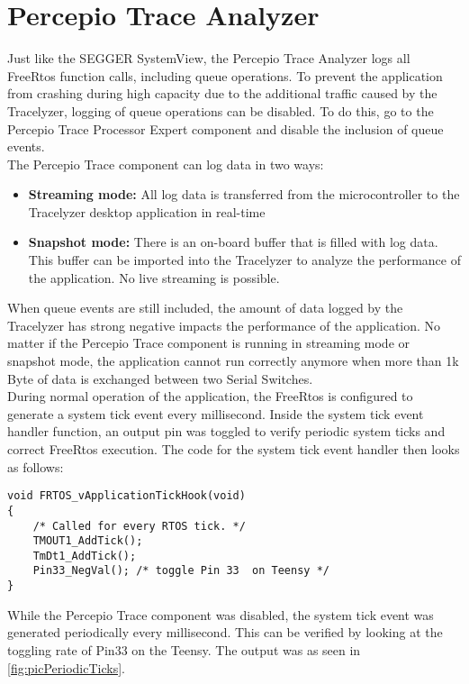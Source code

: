 \section{Percepio Trace Analyzer}
%
%
Just like the SEGGER SystemView, the Percepio Trace Analyzer logs all FreeRtos function calls, including queue operations. To prevent the application from crashing during high capacity due to the additional traffic caused by the Tracelyzer, logging of queue operations can be disabled. To do this, go to the Percepio Trace Processor Expert component and disable the inclusion of queue events.\\
The Percepio Trace component can log data in two ways:
\begin{itemize}
    \item \textbf{Streaming mode:} All log data is transferred from the microcontroller to the Tracelyzer desktop application in real-time
    \item \textbf{Snapshot mode:} There is an on-board buffer that is filled with log data. This buffer can be imported into the Tracelyzer to analyze the performance of the application. No live streaming is possible.
\end{itemize}
When queue events are still included, the amount of data logged by the Tracelyzer has strong negative impacts the performance of the application. No matter if the Percepio Trace component is running in streaming mode or snapshot mode, the application cannot run correctly anymore when more than 1k Byte of data is exchanged between two Serial Switches.\\
During normal operation of the application, the FreeRtos is configured to generate a system tick event every millisecond. Inside the system tick event handler function, an output pin was toggled to verify periodic system ticks and correct FreeRtos execution. The code for the system tick event handler then looks as follows:
\begin{lstlisting}
void FRTOS_vApplicationTickHook(void)
{
    /* Called for every RTOS tick. */
    TMOUT1_AddTick();
    TmDt1_AddTick();
    Pin33_NegVal(); /* toggle Pin 33  on Teensy */
}
\end{lstlisting}
While the Percepio Trace component was disabled, the system tick event was generated periodically every millisecond. This can be verified by looking at the toggling rate of Pin33 on the Teensy. The output was as seen in \autoref{fig:picPeriodicTicks}.\\
